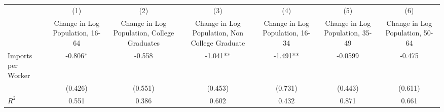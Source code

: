 {
\def\sym#1{\ifmmode^{#1}\else\(^{#1}\)\fi}
\begin{tabular}{l*{6}{c}}
\hline\hline
                    &\multicolumn{1}{c}{(1)}&\multicolumn{1}{c}{(2)}&\multicolumn{1}{c}{(3)}&\multicolumn{1}{c}{(4)}&\multicolumn{1}{c}{(5)}&\multicolumn{1}{c}{(6)}\\
                    &\multicolumn{1}{c}{Change in Log Population, 16-64}&\multicolumn{1}{c}{Change in Log Population, College Graduates}&\multicolumn{1}{c}{Change in Log Population, Non College Graduate}&\multicolumn{1}{c}{Change in Log Population, 16-34}&\multicolumn{1}{c}{Change in Log Population, 35-49}&\multicolumn{1}{c}{Change in Log Population, 50-64}\\
\hline
Imports per Worker  &      -0.806*  &      -0.558   &      -1.041** &      -1.491** &     -0.0599   &      -0.475   \\
                    &     (0.426)   &     (0.551)   &     (0.453)   &     (0.731)   &     (0.443)   &     (0.611)   \\
\hline
\(R^{2}\)           &       0.551   &       0.386   &       0.602   &       0.432   &       0.871   &       0.661   \\
\hline\hline
\end{tabular}
}
